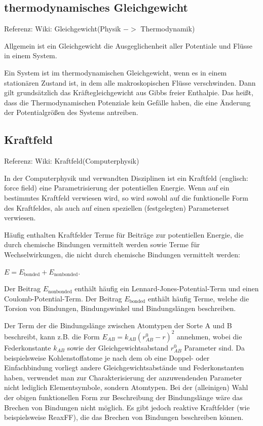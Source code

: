 \documentclass[]{article}
\begin{document}
\subsection{thermodynamisches Gleichgewicht}
Referenz: Wiki: Gleichgewicht(Physik $->$ Thermodynamik) 

Allgemein ist ein Gleichgewicht die Ausgeglichenheit aller Potentiale und Flüsse in einem System.
 
Ein System ist im thermodynamischen Gleichgewicht, wenn es in einem stationären Zustand ist, in dem alle makroskopischen Flüsse verschwinden. Dann gilt grundsätzlich das Kräftegleichgewicht aus Gibbs freier Enthalpie. Das heißt, dass die Thermodynamischen Potenziale kein Gefälle haben, die eine Änderung der Potentialgrößen des Systems antreiben.

\subsection{Kraftfeld}
Referenz: Wiki: Kraftfeld(Computerphysik)

In der Computerphysik und verwandten Disziplinen ist ein Kraftfeld (englisch: force field) eine Parametrisierung der potentiellen Energie. Wenn auf ein bestimmtes Kraftfeld verwiesen wird, so wird sowohl auf die funktionelle Form des Kraftfeldes, als auch auf einen speziellen (festgelegten) Parameterset verwiesen.

Häufig enthalten Kraftfelder Terme für Beiträge zur potentiellen Energie, die durch chemische Bindungen vermittelt werden sowie Terme für Wechselwirkungen, die nicht durch chemische Bindungen vermittelt werden:

$E=E_\text{bonded}+E_\text{nonbonded}$.

Der Beitrag $E_\text{nonbonded}$ enthält häufig ein Lennard-Jones-Potential-Term und einen Coulomb-Potential-Term. Der Beitrag $E_\text{bonded}$ enthält häufig Terme, welche die Torsion von Bindungen, Bindungswinkel und Bindungslängen beschreiben.

Der Term der die Bindungslänge zwischen Atomtypen der Sorte A und B beschreibt, kann z.B. die Form $E_{AB} = k_{AB} (r_{AB}^0 - r)^2$ annehmen, wobei die Federkonstante $k_{AB}$ sowie der Gleichgewichtsabstand $r_{AB}^0$ Parameter sind. Da beispielsweise Kohlenstoffatome je nach dem ob eine Doppel- oder Einfachbindung vorliegt andere Gleichgewichtsabstände und Federkonstanten haben, verwendet man zur Charakterisierung der anzuwendenden Parameter nicht lediglich Elementsymbole, sondern Atomtypen. Bei der (alleinigen) Wahl der obigen funktionellen Form zur Beschreibung der Bindungslänge wäre das Brechen von Bindungen nicht möglich. Es gibt jedoch reaktive Kraftfelder (wie beispielsweise ReaxFF), die das Brechen von Bindungen beschreiben können.
\end{document}
